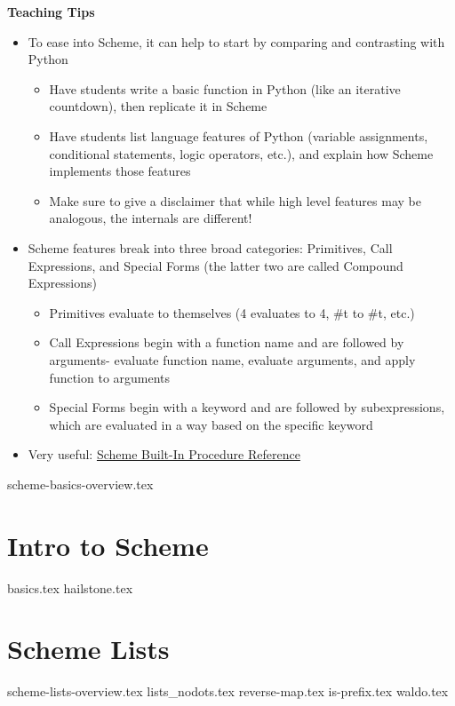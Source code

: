 \documentclass{exam}
\begin{document}
\begin{blocksection}
\begin{guide}
\textbf{Teaching Tips}
\begin{itemize}
  \item To ease into Scheme, it can help to start by comparing and contrasting with Python
  \begin{itemize}
    \item Have students write a basic function in Python (like an iterative countdown), then replicate it in Scheme
    \item Have students list language features of Python (variable assignments, conditional statements, logic operators, etc.), and explain how Scheme implements those features
    \item Make sure to give a disclaimer that while high level features may be analogous, the internals are different!
  \end{itemize}
  \item Scheme features break into three broad categories: Primitives, Call Expressions, and Special Forms (the latter two are called Compound Expressions)
  \begin{itemize}
    \item Primitives evaluate to themselves (4 evaluates to 4, \#t to \#t, etc.)
    \item Call Expressions begin with a function name and are followed by arguments- evaluate function name, evaluate arguments, and apply function to arguments
    \item Special Forms begin with a keyword and are followed by subexpressions, which are evaluated in a way based on the specific keyword
  \end{itemize}
  \item Very useful: \href{https://cs61a.org/articles/scheme-builtins.html}{Scheme Built-In Procedure Reference}
\end{itemize}
\end{guide}
\end{blocksection}
{scheme-basics-overview.tex}
\newpage
\section{Intro to Scheme}
\begin{questions}
{basics.tex}
{hailstone.tex}

\section{Scheme Lists}
{scheme-lists-overview.tex}
\newpage
{lists_nodots.tex}
\newpage
{reverse-map.tex}
{is-prefix.tex}
{waldo.tex}
\end{questions}
\end{document}

